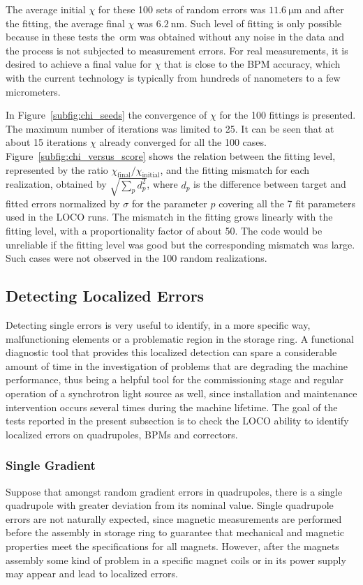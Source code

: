 The average initial $\chi$ for these 100 sets of random errors was $\SI{11.6}{\micro\meter}$ and after the fitting, the average final $\chi$ was $\SI{6.2}{\nano\meter}$. Such level of fitting is only possible because in these tests the~\gls{orm} was obtained without any noise in the data and the process is not subjected to measurement errors. For real measurements, it is desired to achieve a final value for $\chi$ that is close to the BPM accuracy, which with the current technology is typically from hundreds of nanometers to a few micrometers.

In Figure~\ref{subfig:chi_seeds} the convergence of $\chi$ for the 100 fittings is presented. The maximum number of iterations was limited to 25. It can be seen that at about 15 iterations $\chi$ already converged for all the 100 cases. Figure~\ref{subfig:chi_versus_score} shows the relation between the fitting level, represented by the ratio $\chi_{\mathrm{final}}/\chi_{\mathrm{initial}}$, and the fitting mismatch for each realization, obtained by $\sqrt{\sum_{p}d_p^2}$, where $d_p$ is the difference between target and fitted errors normalized by $\sigma$ for the parameter $p$ covering all the 7 fit parameters used in the LOCO runs. The mismatch in the fitting grows linearly with the fitting level, with a proportionality factor of about 50. The code would be unreliable if the fitting level was good but the corresponding mismatch was large. Such cases were not observed in the 100 random realizations.
\subsection{Detecting Localized Errors}
Detecting single errors is very useful to identify, in a more specific way, malfunctioning elements or a problematic region in the storage ring. A functional diagnostic tool that provides this localized detection can spare a considerable amount of time in the investigation of problems that are degrading the machine performance, thus being a helpful tool for the commissioning stage and regular operation of a synchrotron light source as well, since installation and maintenance intervention occurs several times during the machine lifetime. The goal of the tests reported in the present subsection is to check the LOCO ability to identify localized errors on quadrupoles, BPMs and correctors. 

\subsubsection{Single Gradient}
Suppose that amongst random gradient errors in quadrupoles, there is a single quadrupole with greater deviation from its nominal value. Single quadrupole errors are not naturally expected, since magnetic measurements are performed before the assembly in storage ring to guarantee that mechanical and magnetic properties meet the specifications for all magnets. However, after the magnets assembly some kind of problem in a specific magnet coils or in its power supply may appear and lead to localized errors.

